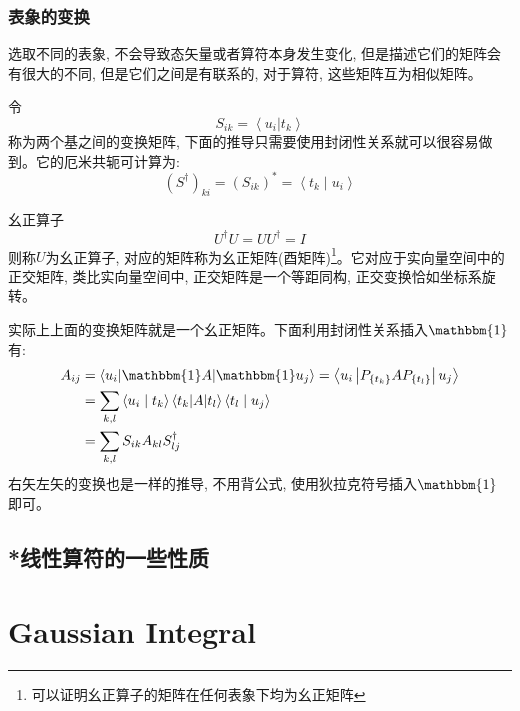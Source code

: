 \subsection*{表象的变换}
选取不同的表象, 不会导致态矢量或者算符本身发生变化, 但是描述它们的矩阵会有很大的不同, 但是它们之间是有联系的, 对于算符, 这些矩阵互为相似矩阵。

令$$S_{ik}=\left\langle u_i  | t_k  \right\rangle$$称为两个基之间的变换矩阵, 下面的推导只需要使用封闭性关系就可以很容易做到。它的厄米共轭可计算为:
$$
\left(S^{\dagger}\right)_{k i}=\left(S_{i k}\right)^{*}=\left\langle t_{k} \mid u_{i}\right\rangle
$$
\begin{define}{幺正算子}
    \begin{equation}
        \boxed{U^\dagger U=U U^\dagger=I}
    \end{equation}
    则称$U$为幺正算子, 对应的矩阵称为幺正矩阵(酉矩阵)\footnote[1]{可以证明幺正算子的矩阵在任何表象下均为幺正矩阵}。它对应于实向量空间中的正交矩阵, 类比实向量空间中, 正交矩阵是一个等距同构, 正交变换恰如坐标系旋转。
\end{define}
实际上上面的变换矩阵就是一个幺正矩阵。下面利用封闭性关系插入$\mathbbm{1}$有:
\begin{equation*}
   \begin{aligned}
    A_{i j} &=\left\langle u_{i}|\mathbbm{1}A|\mathbbm{1}u_{j}\right\rangle=\left\langle u_{i}\left|P_{\left\{t_{k}\right\}} A P_{\left\{t_{l}\right\}}\right| u_{j}\right\rangle \\
    &=\sum_{k, l}\left\langle u_{i} \mid t_{k}\right\rangle\left\langle t_{k}|A| t_{l}\right\rangle\left\langle t_{l} \mid u_{j}\right\rangle \\
    &=\sum_{k, l} S_{i k} A_{k l} S_{l j}^{\dagger}
    \end{aligned} 
\end{equation*}
右矢左矢的变换也是一样的推导, 不用背公式, 使用狄拉克符号插入$\mathbbm{1}$即可。
\section{*线性算符的一些性质}












\chapter{Gaussian Integral}
